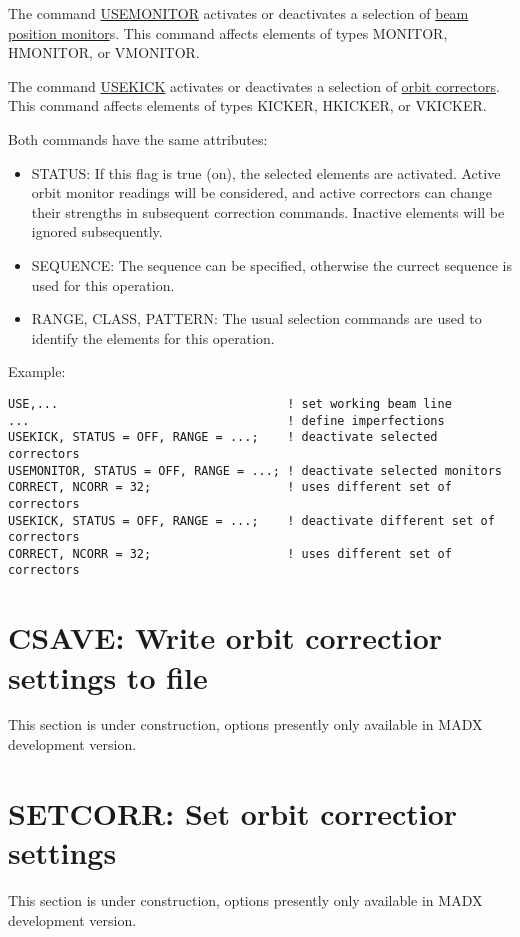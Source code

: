 The command \href{monitor}{USEMONITOR} activates or deactivates a
selection of \href{../Introduction/monitors.html}{beam position
 monitor}s. This command affects elements of types MONITOR, HMONITOR,
or VMONITOR.    

The command  \href{kick}{USEKICK} activates or deactivates a selection
of \href{../Introduction/kickers.html}{orbit correctors}. This command
affects elements of types KICKER, HKICKER, or VKICKER.   


Both commands have the same attributes: 
\begin{itemize}
   \item STATUS: If this flag is true (on), the selected elements
     are activated. Active orbit monitor readings will be
     considered, and active correctors can change their strengths
     in subsequent correction commands. Inactive elements will be
     ignored subsequently.  
   \item SEQUENCE: The sequence can be specified, otherwise the
     currect sequence is used for this operation.  
   \item RANGE, CLASS, PATTERN: The usual selection commands are
     used to identify the elements for this operation.  
\end{itemize} 

Example:
\begin{verbatim}
USE,...                                ! set working beam line 
...                                    ! define imperfections 
USEKICK, STATUS = OFF, RANGE = ...;    ! deactivate selected correctors 
USEMONITOR, STATUS = OFF, RANGE = ...; ! deactivate selected monitors   
CORRECT, NCORR = 32;                   ! uses different set of correctors
USEKICK, STATUS = OFF, RANGE = ...;    ! deactivate different set of correctors 
CORRECT, NCORR = 32;                   ! uses different set of correctors
\end{verbatim}


%
\section{CSAVE: Write orbit correctior settings to file}
\label{sec:csave}
 This section is under construction, options presently only available in
 MADX development version.  

\section{SETCORR: Set orbit correctior settings}
 This section is under construction, options presently only available in
 MADX development version.  


